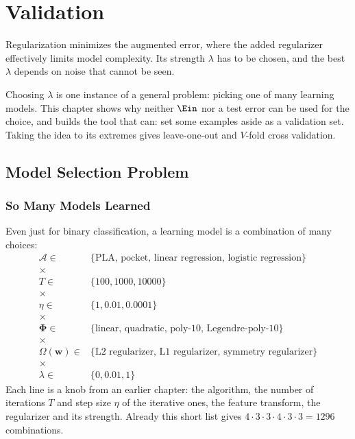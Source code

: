 \chapter{Validation}

\begin{prev}
    Regularization minimizes the augmented error, where the added regularizer
    effectively limits model complexity. Its strength \(\lambda\) has to be
    chosen, and the best \(\lambda\) depends on noise that cannot be seen.
\end{prev}

Choosing \(\lambda\) is one instance of a general problem: picking one of many
learning models. This chapter shows why neither \(\Ein\) nor a test error can
be used for the choice, and builds the tool that can: set some examples aside
as a validation set. Taking the idea to its extremes gives leave-one-out and
\(V\)-fold cross validation.

\section{Model Selection Problem}\label{sec:model-selection}


\subsection{So Many Models Learned}

Even just for binary classification, a learning model is a combination of
many choices:
\[
    \begin{array}{rl}
        \mathcal{A} \in & \{\text{PLA, pocket, linear regression, logistic
        regression}\}\\
        \times & \\
        T \in & \{100, 1000, 10000\}\\
        \times & \\
        \eta \in & \{1, 0.01, 0.0001\}\\
        \times & \\
        \bm{\Phi} \in & \{\text{linear, quadratic, poly-10,
        Legendre-poly-10}\}\\
        \times & \\
        \Omega(\bm{w}) \in & \{\text{L2 regularizer, L1 regularizer, symmetry
        regularizer}\}\\
        \times & \\
        \lambda \in & \{0, 0.01, 1\}
    \end{array}
\]
Each line is a knob from an earlier chapter: the algorithm, the number of
iterations \(T\) and step size \(\eta\) of the iterative ones, the feature
transform, the regularizer and its strength. Already this short list gives
\(4 \cdot 3 \cdot 3 \cdot 4 \cdot 3 \cdot 3 = 1296\) combinations.

